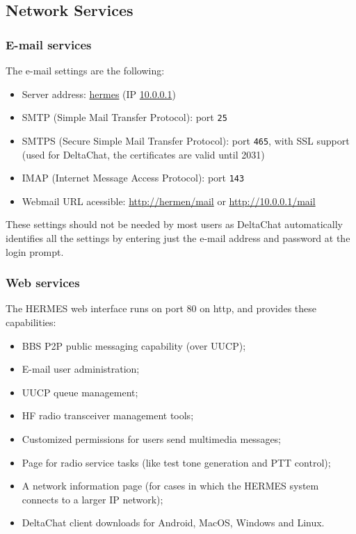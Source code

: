\documentclass[11pt,a4paper]{article}
\begin{document}
\subsection{Network Services} 
\label{apx_net_services}

\subsubsection{E-mail services}
\label{apx_net_email}

The e-mail settings are the following:

\begin{itemize}
    \item Server address: \url{hermes} (IP \url{10.0.0.1})
    \item SMTP (Simple Mail Transfer Protocol): port \texttt{25}
    \item SMTPS (Secure Simple Mail Transfer Protocol): port \texttt{465}, with SSL support 
    (used for DeltaChat, the certificates are valid until 2031)
    \item IMAP (Internet Message Access Protocol): port \texttt{143}
    \item Webmail URL acessible: \url{http://hermen/mail} or \url{http://10.0.0.1/mail}
\end{itemize}

These settings should not be needed by most users as DeltaChat automatically identifies all the settings by entering just the e-mail address and password at the login prompt.

\subsubsection{Web services}
\label{apx_net_web}

The HERMES web interface runs on port 80 on http, and provides these capabilities:
\begin{itemize}
    \item BBS P2P public messaging capability (over UUCP);
    \item E-mail user administration;
    \item UUCP queue management;
    \item HF radio transceiver management tools;
    \item Customized permissions for users send multimedia messages;
    \item Page for radio service tasks (like test tone generation and PTT control);
    \item A network information page (for cases in which the HERMES system connects to a larger IP network);
    \item DeltaChat client downloads for Android, MacOS, Windows and Linux.
\end{itemize}
\end{document}
